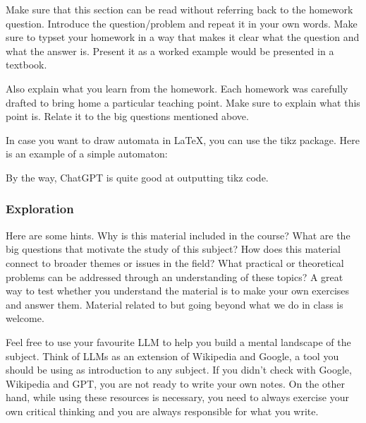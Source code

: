 \documentclass{article}
\theoremstyle{theorem}
\theoremstyle{definition}
\theoremstyle{remark}
\begin{document}
Make sure that this section can be read without referring back to the homework question. Introduce the question/problem and repeat it in your own words. Make sure to typset your homework in a way that makes it clear what  the question and what the answer is. Present it as a worked example would be presented in a textbook. 

Also explain what you learn from the homework. Each homework was carefully drafted to bring home a particular teaching point. Make sure to explain what this point is. Relate it to the big questions mentioned above. 

In case you want to draw automata in \LaTeX{}, you can use the tikz package. Here is an example of a simple automaton:


By the way, ChatGPT is quite good at outputting tikz code.

\subsubsection{Exploration}

Here are some hints. Why is this material included in the course? What are the big questions that motivate the study of this subject? How does this material connect to broader themes or issues in the field? What practical or theoretical problems can be addressed through an understanding of these topics? A great way to test whether you understand the material is to make your own exercises and answer them. Material related to but going beyond what we do in class is welcome.

Feel free to use your favourite LLM to help you build a mental landscape of the subject. Think of LLMs as an extension of Wikipedia and Google, a tool you should be using as introduction to any subject. If you didn't check with Google, Wikipedia and GPT, you are not ready to write your own notes. On the other hand, while using these resources is necessary, you need to always exercise your own critical thinking and you are always responsible for what you write. 
\end{document}
